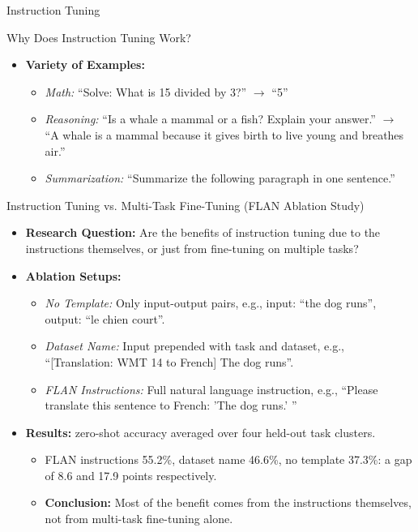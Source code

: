 \begin{frame}[allowframebreaks]{Instruction Tuning}
\begin{block}{Why Does Instruction Tuning Work?}
\begin{itemize}
            \item \textbf{Variety of Examples:}
            \begin{itemize}
                \item \textit{Math:} ``Solve: What is 15 divided by 3?'' $\rightarrow$ ``5''
                \item \textit{Reasoning:} ``Is a whale a mammal or a fish? Explain your answer.'' $\rightarrow$ ``A whale is a mammal because it gives birth to live young and breathes air.''
                \item \textit{Summarization:} ``Summarize the following paragraph in one sentence.''
            \end{itemize}
        \end{itemize}
    \end{block}
    \framebreak
    \begin{block}{Instruction Tuning vs. Multi-Task Fine-Tuning (FLAN Ablation Study)}
        \begin{itemize}
            \item \textbf{Research Question:} Are the benefits of instruction tuning due to the instructions themselves, or just from fine-tuning on multiple tasks?
            \item \textbf{Ablation Setups:}
            \begin{itemize}
                \item \textit{No Template:} Only input-output pairs, e.g., input: ``the dog runs'', output: ``le chien court''.
                \item \textit{Dataset Name:} Input prepended with task and dataset, e.g., ``[Translation: WMT 14 to French] The dog runs''.
                \item \textit{FLAN Instructions:} Full natural language instruction, e.g., ``Please translate this sentence to French: 'The dog runs.' ''
            \end{itemize}
            \item \textbf{Results:} zero-shot accuracy averaged over four held-out task clusters.
            \begin{itemize}
                \item FLAN instructions 55.2\%, dataset name 46.6\%, no template 37.3\%: a gap of 8.6 and 17.9 points respectively.
                \item \textbf{Conclusion:} Most of the benefit comes from the instructions themselves, not from multi-task fine-tuning alone.
            \end{itemize}

\end{itemize}
\end{block}
\end{frame}
